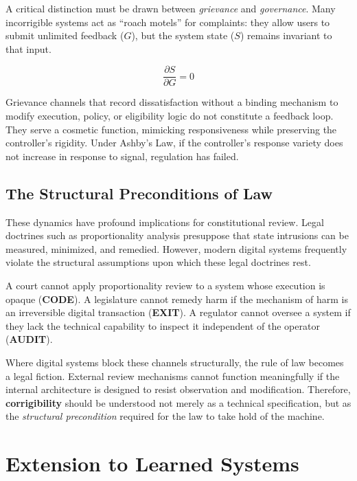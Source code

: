 \documentclass{article}
\begin{document}
A critical distinction must be drawn between \textit{grievance} and \textit{governance}. Many incorrigible systems act as ``roach motels'' for complaints: they allow users to submit unlimited feedback ($G$), but the system state ($S$) remains invariant to that input.

\begin{equation}
\frac{\partial S}{\partial G} = 0
\end{equation}

Grievance channels that record dissatisfaction without a binding mechanism to modify execution, policy, or eligibility logic do not constitute a feedback loop. They serve a cosmetic function, mimicking responsiveness while preserving the controller's rigidity. Under Ashby's Law, if the controller's response variety does not increase in response to signal, regulation has failed.

\subsection{The Structural Preconditions of Law}

These dynamics have profound implications for constitutional review. Legal doctrines such as proportionality analysis presuppose that state intrusions can be measured, minimized, and remedied. However, modern digital systems frequently violate the structural assumptions upon which these legal doctrines rest.

A court cannot apply proportionality review to a system whose execution is opaque (\textbf{CODE}). A legislature cannot remedy harm if the mechanism of harm is an irreversible digital transaction (\textbf{EXIT}). A regulator cannot oversee a system if they lack the technical capability to inspect it independent of the operator (\textbf{AUDIT}).

Where digital systems block these channels structurally, the rule of law becomes a legal fiction. External review mechanisms cannot function meaningfully if the internal architecture is designed to resist observation and modification. Therefore, \textbf{corrigibility} should be understood not merely as a technical specification, but as the \textit{structural precondition} required for the law to take hold of the machine.

\section{Extension to Learned Systems}
\end{document}
